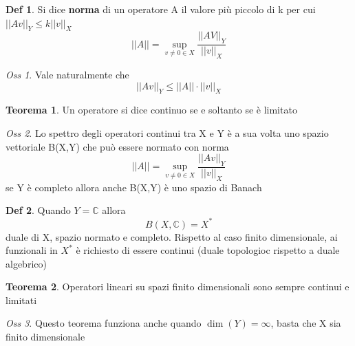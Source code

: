 \documentclass[a4paper,11pt]{report}
\theoremstyle{remark}
\newtheorem*{oss}{Oss}
\theoremstyle{definition}
\newtheorem*{teo}{Teorema}
\newtheorem*{Def}{Def}
\newcommand{\C}{\mathbb{C}}
\begin{document}
\begin{Def}
	Si dice \textbf{norma} di un operatore A il valore più piccolo di k per cui ${||Av||}_Y \le k {||v||}_X$
	\begin{equation*}
		||A|| = \sup_{v \ne 0 \in X} \frac{{||AV||}_Y}{{||v||}_X}
	\end{equation*}
\end{Def}

\begin{oss}
	Vale naturalmente che 
	\begin{equation*}
		{||Av||}_Y \le ||A|| \cdot {||v||}_X
	\end{equation*}
\end{oss}

\begin{teo}
	Un operatore si dice continuo se e soltanto se è limitato
\end{teo}

\begin{oss}
	Lo spettro degli operatori continui tra X e Y è a sua volta uno spazio vettoriale B(X,Y) che può essere normato con norma
	\begin{equation*}
		||A|| = \sup_{v\ne 0 \in X} \frac{{||Av||}_Y}{{||v||}_X}
	\end{equation*}
	se Y è completo allora anche B(X,Y) è uno spazio di Banach
\end{oss}

\begin{Def}
	Quando $Y = \C$ allora 
	\begin{equation*}
		B(X,\C) = X^*
	\end{equation*}
	duale di X, spazio normato e completo. Rispetto al caso finito dimensionale, ai funzionali in $X^*$ è richiesto di essere continui (duale topologioc rispetto a duale algebrico)
\end{Def}

\begin{teo}
	Operatori lineari su spazi finito dimensionali sono sempre continui e limitati
\end{teo}

\begin{oss}
	Questo teorema funziona anche quando $\dim(Y) = \infty$, basta che X sia finito dimensionale
\end{oss}
\end{document}
